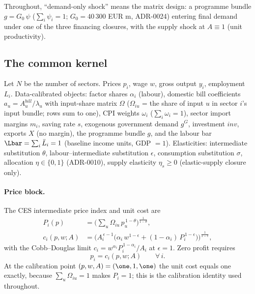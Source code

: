Throughout, ``demand-only shock'' means the matrix design: a programme bundle
$g = G_0\,\psi$ ($\sum_i \psi_i = 1$; $G_0 = 40\,300$
EUR m, ADR-0024) entering final demand under one of the three financing
closures, with the supply shock at $A \equiv 1$ (unit productivity).

\subsection{The common kernel}\label{app:eqkernel}

Let $N$ be the number of sectors. Prices $p_i$, wage $w$, gross output
$y_i$, employment $L_i$. Data-calibrated objects: factor shares $\alpha_i$
(labour), domestic bill coefficients $a_u = A^{bill}_u/\lambda_u$ with
input-share matrix $\Omega$ ($\Omega_{iu}$ = the share of input
$u$ in sector $i$'s input bundle; rows sum to one), CPI weights $\omega_i$ ($\sum_i \omega_i = 1$),
sector import margins $m_i$, saving rate $s$, exogenous government demand
$g^G$, investment $inv$, exports $X$ (no margin), the programme bundle $g$,
and the labour bar $\Lbar = \sum_i \bar{L}_i = 1$ (baseline income units,
GDP $=1$). Elasticities: intermediate substitution $\theta$,
labour--intermediate substitution $\epsilon$, consumption substitution
$\sigma$, allocation $\eta \in \{0,1\}$ (ADR-0010), supply elasticity
$\eta_s \geq 0$ (elastic-supply closure only).

\paragraph{Price block.} The CES intermediate price index and unit cost are
\begin{align}
P_i(p) &= \Big( \textstyle\sum_u \Omega_{iu}\, p_u^{\,1-\theta}
   \Big)^{\frac{1}{1-\theta}}, \label{eq:ip}\\
c_i(p,w;A) &= \Big( A_i^{\,\epsilon-1}\big( \alpha_i\, w^{1-\epsilon}
   + (1-\alpha_i)\, P_i^{\,1-\epsilon} \big) \Big)^{\frac{1}{1-\epsilon}},
   \label{eq:cost}
\end{align}
with the Cobb--Douglas limit $c_i = w^{\alpha_i} P_i^{\,1-\alpha_i}/A_i$ at
$\epsilon = 1$. Zero profit requires
\begin{equation}
p_i = c_i(p,w;A) \qquad \forall\, i. \label{eq:zp}
\end{equation}
At the calibration point $(p,w,A) = (\one,1,\one)$ the unit cost equals one
exactly, because $\sum_u \Omega_{iu} = 1$ makes $P_i = 1$; this is the
calibration identity used throughout.

